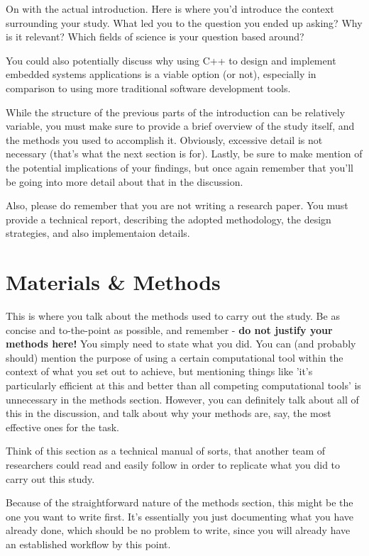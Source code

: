 \documentclass[10pt,twocolumn,letterpaper]{article}
\begin{document}
On with the actual introduction. Here is where you'd introduce the context surrounding your study. What led you to the question you ended up asking? Why is it relevant? Which fields of science is your question based around?

You could also potentially discuss why using C++ to design and implement embedded systems applications is a viable option (or not), especially in comparison to using more traditional software development tools.

While the structure of the previous parts of the introduction can be relatively variable, you must make sure to provide a brief overview of the study itself, and the methods you used to accomplish it. Obviously, excessive detail is not necessary (that's what the next section is for). Lastly, be sure to make mention of the potential implications of your findings, but once again remember that you'll be going into more detail about that in the discussion.

Also, please do remember that you are not writing a research paper. You must provide a technical report, describing the adopted methodology, the design strategies, and also implementaion details.

\section{Materials \& Methods}

This is where you talk about the methods used to carry out the study. Be as concise and to-the-point as possible, and remember - \textbf{do not justify your methods here!} You simply need to state what you did. You can (and probably should) mention the purpose of using a certain computational tool within the context of what you set out to achieve, but mentioning things like 'it's particularly efficient at this and better than all competing computational tools' is unnecessary in the methods section. However, you can definitely talk about all of this in the discussion, and talk about why your methods are, say, the most effective ones for the task.

Think of this section as a technical manual of sorts, that another team of researchers could read and easily follow in order to replicate what you did to carry out this study.

Because of the straightforward nature of the methods section, this might be the one you want to write first. It's essentially you just documenting what you have already done, which should be no problem to write, since you will already have an established workflow by this point.
\end{document}

